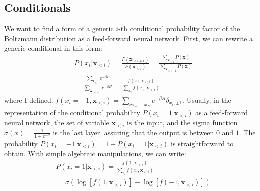 \documentclass[aps,physrev,10pt,floatfix,longbibliography,nofootinbib,reprint]{revtex4-2}
\begin{document}
\subsection{Conditionals}
 We want to find a form of a generic $i$-th conditional probability factor of the Boltzmann distribution as a feed-forward neural network. First, we can rewrite a generic conditional in this form: 
\begin{equation}
    \label{eq:chain}
    \begin{split}
    & P\left(x_{i}|\mathbf{x}_{<i}\right)  = 
    \frac{P\left(\mathbf{x}_{<i+1}\right)}{P\left(\mathbf{x}_{<i}\right)}  = 
    \frac{\sum_{\mathbf{x}_{>i}}P\left(\mathbf{x}\right)}{\sum_{\mathbf{x}_{>i-1}}P\left(\mathbf{x}\right)} \\
    &=\frac{\sum_{\mathbf{x}_{>i}}e^{-\beta H}}{\sum_{\mathbf{x}_{>i-1}}e^{-\beta H}}  = 
    \frac{f\left(x_{i},\mathbf{x}_{<i}\right)}{\sum_{x_{i}}f\left(x_{i},\mathbf{x}_{<i}\right)}.
    \end{split}
\end{equation}
where I defined: $f\left(x_{i}=\pm 1,\mathbf{x}_{<i}\right) = \sum_{x_{i+1}\dots x_{N}}e^{-\beta H}\delta_{x_i, \pm1}$. Usually, in the representation of the conditional probability $P\left(x_{i}=1|\mathbf{x}_{<i}\right)$ as a feed-forward neural network, the set of variable $\mathbf{x}_{<i}$ is the input, and the sigma function $\sigma(x)=\frac{1}{1+e^{-x}}$ is the last layer, assuring that the output is between $0$ and $1$. The probability $P\left(x_{i}=-1|\mathbf{x}_{<i}\right) = 1 - P\left(x_{i}=1|\mathbf{x}_{<i}\right)$ is straightforward to obtain. With simple algebraic manipulations, we can write: 
\begin{equation}
    \label{eq:sigma_log}
    \begin{split}
    & P\left(x_{i}=1|\mathbf{x}_{<i}\right) = \frac{f\left(1,\mathbf{x}_{<i}\right)}{\sum_{x_{i}}f\left(x_{i},\mathbf{x}_{<i}\right)}\\
    &= \sigma\left(\log\left[f\left(1,\mathbf{x}_{<i}\right)\right]-\log\left[f\left(-1,\mathbf{x}_{<i}\right)\right]\right)
    \end{split}
\end{equation}
\end{document}
